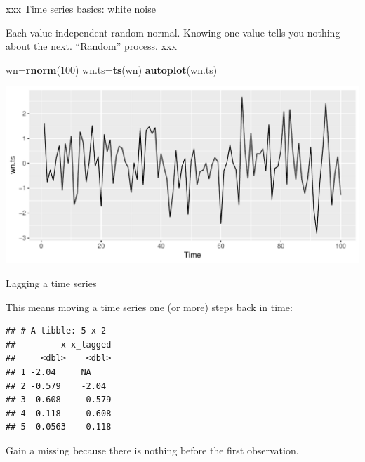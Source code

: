 \documentclass[ignorenonframetext,]{beamer}
\newenvironment{Shaded}{\begin{snugshade}}{\end{snugshade}}
\newcommand{\DataTypeTok}[1]{\textcolor[rgb]{0.13,0.29,0.53}{#1}}
\newcommand{\DecValTok}[1]{\textcolor[rgb]{0.00,0.00,0.81}{#1}}
\newcommand{\KeywordTok}[1]{\textcolor[rgb]{0.13,0.29,0.53}{\textbf{#1}}}
\newcommand{\NormalTok}[1]{#1}
\newcommand{\OperatorTok}[1]{\textcolor[rgb]{0.81,0.36,0.00}{\textbf{#1}}}
\newcommand{\StringTok}[1]{\textcolor[rgb]{0.31,0.60,0.02}{#1}}
\begin{document}
\begin{frame}[fragile]{xxx Time series basics: white noise}
\protect\hypertarget{xxx-time-series-basics-white-noise}{}

Each value independent random normal. Knowing one value tells you
nothing about the next. ``Random'' process. xxx

\begin{Shaded}
\begin{Highlighting}[]
\NormalTok{wn=}\KeywordTok{rnorm}\NormalTok{(}\DecValTok{100}\NormalTok{)}
\NormalTok{wn.ts=}\KeywordTok{ts}\NormalTok{(wn)}
\KeywordTok{autoplot}\NormalTok{(wn.ts)}
\end{Highlighting}
\end{Shaded}

\includegraphics{figure/White-Noise-1.pdf}

\end{frame}

\begin{frame}[fragile]{Lagging a time series}
\protect\hypertarget{lagging-a-time-series}{}

This means moving a time series one (or more) steps back in time:

\begin{Shaded}
\end{Shaded}

\begin{verbatim}
## # A tibble: 5 x 2
##         x x_lagged
##     <dbl>    <dbl>
## 1 -2.04     NA    
## 2 -0.579    -2.04 
## 3  0.608    -0.579
## 4  0.118     0.608
## 5  0.0563    0.118
\end{verbatim}

Gain a missing because there is nothing before the first observation.

\end{frame}
\end{document}
